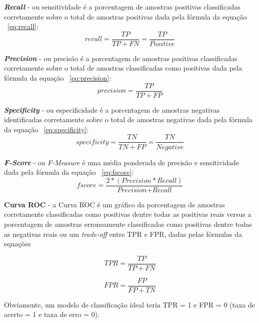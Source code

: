 \textbf{\textit{Recall}} - ou sensitividade é a porcentagem de amostras positivas classificadas corretamente sobre o total de amostras positivas dada pela fórmula da equação ~\ref{eq:recall}:
\begin{equation} \label{eq:recall}
  recall = \frac{TP}{TP+FN} = \frac{TP}{\textit{Positive}}
\end{equation}

\textbf{\textit{Precision}} - ou precisão é a porcentagem de amostras positivas classificadas corretamente sobre o total de amostras classificadas como positivas dada pela fórmula da equação ~\ref{eq:precision}:
\begin{equation} \label{eq:precision}
    precision = \frac{TP}{TP+FP}
\end{equation}

\textbf{\textit{Specificity}} - ou especificidade é a porcentagem de amostras negativas identificadas corretamente sobre o total de amostras negativas dada pela fórmula da equação ~\ref{eq:specificity}:
\begin{equation} \label{eq:specificity}
    specificity = \frac{TN}{TN+FP}=\frac{TN}{\textit{Negative}}
\end{equation}

\textbf{\textit{F-Score}} - ou \textit{F-Measure} é uma média ponderada de precisão e sensitividade dada pela fórmula da equação ~\ref{eq:fscore}:
\begin{equation} \label{eq:fscore}
    fscore=\frac{2*(\textit{Precision}*\textit{Recall})}{\textit{Precision}+\textit{Recall}}
\end{equation}

\textbf{Curva ROC} - a Curva ROC é um gráfico da porcentagem de amostras corretamente classificadas como positivas dentre todas as positivas reais versus a porcentagem de amostras erroneamente classificadas como positivas dentre todas as negativas reais ou um \textit{trade-off} entre TPR e FPR, dadas pelas fórmulas da equações  

\begin{equation} \label{eq:tpr}
    TPR=\frac{TP}{TP+FN}
\end{equation}

\begin{equation} \label{eq:fpr}
    FPR=\frac{FP}{FP+TN}
\end{equation}

Obviamente, um modelo de classificação ideal teria TPR = 1 e FPR = 0 (taxa de acerto = 1 e taxa de erro = 0).

